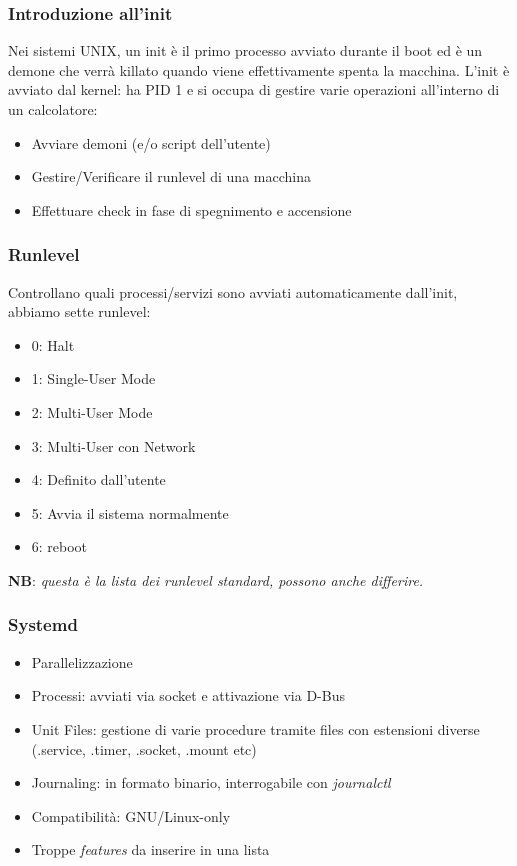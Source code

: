 \documentclass{beamer}
\begin{document}
\begin{frame}
\frametitle{Introduzione all'init}
Nei sistemi UNIX, un init \`e il primo processo avviato durante il boot ed \`e un demone che verr\`a killato quando viene effettivamente spenta la macchina. L'init \`e avviato dal kernel: ha PID 1 e si occupa di gestire varie operazioni all'interno di un calcolatore:
\begin{itemize}
	\item Avviare demoni (e/o script dell'utente)
	\item Gestire/Verificare il runlevel di una macchina
	\item Effettuare check in fase di spegnimento e accensione \\
\end{itemize}
\end{frame}


\begin{frame}
\frametitle{Runlevel}
Controllano quali processi/servizi sono avviati automaticamente dall'init, abbiamo sette runlevel:
\begin{itemize}
	\item 0: Halt
	\item 1: Single-User Mode
	\item 2: Multi-User Mode
	\item 3: Multi-User con Network
	\item 4: Definito dall'utente
	\item 5: Avvia il sistema normalmente
	\item 6: reboot
\end{itemize}

\textbf{NB}: \textit{questa \`e la lista dei runlevel standard, possono anche differire.}
\end{frame}


\begin{frame}
\frametitle{Systemd}
\begin{itemize}
	\item Parallelizzazione
	\item Processi: avviati via socket e attivazione via D-Bus
	\item Unit Files: gestione di varie procedure tramite files con estensioni diverse (.service, .timer, .socket, .mount etc)
	\item Journaling: in formato binario, interrogabile con \textit{journalctl}
	\item Compatibilit\`a: GNU/Linux-only
	\item Troppe \textit{features} da inserire in una lista
\end{itemize}
\end{frame}
\end{document}
